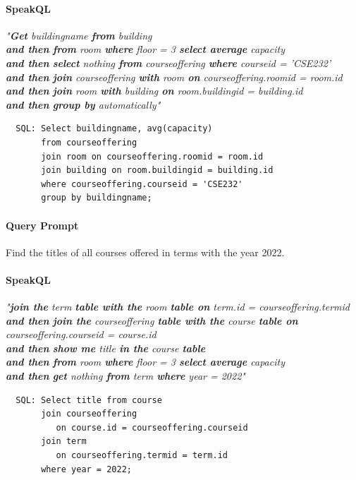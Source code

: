 \paragraph{SpeakQL} 
\emph{
  "\textbf{Get} buildingname \textbf{from} building \\
  \textbf{and then}
  \textbf{from} room \textbf{where} floor = 3 \textbf{select average} capacity \\
  \textbf{and then}
  \textbf{select} nothing \textbf{from} courseoffering \textbf{where} courseid = 'CSE232' \\
  \textbf{and then}
  \textbf{join} courseoffering \textbf{with} room \textbf{on} courseoffering.roomid = room.id \\
  \textbf{and then}
  \textbf{join} room \textbf{with} building \textbf{on} room.buildingid = building.id \\
  \textbf{and then}
  \textbf{group by} automatically"
}


\begin{verbatim}
  SQL: Select buildingname, avg(capacity)
       from courseoffering
       join room on courseoffering.roomid = room.id
       join building on room.buildingid = building.id
       where courseoffering.courseid = 'CSE232'
       group by buildingname;
\end{verbatim}

\paragraph{Query Prompt} Find the titles of all courses offered in terms with the year 2022. 

\paragraph{SpeakQL} 
\emph{
  "\textbf{join the} term \textbf{table with the} room \textbf{table on} term.id = courseoffering.termid \\
  \textbf{and then}
  \textbf{join the} courseoffering \textbf{table with the} course \textbf{table on} courseoffering.courseid = course.id \\
  \textbf{and then}
  \textbf{show me} title \textbf{in the} course \textbf{table} \\
  \textbf{and then}
  \textbf{from} room \textbf{where} floor = 3 \textbf{select average} capacity \\
  \textbf{and then}
  \textbf{get} nothing \textbf{from} term \textbf{where} year = 2022"
}
\begin{verbatim}
  SQL: Select title from course
       join courseoffering 
          on course.id = courseoffering.courseid
       join term 
          on courseoffering.termid = term.id
       where year = 2022;
\end{verbatim}



